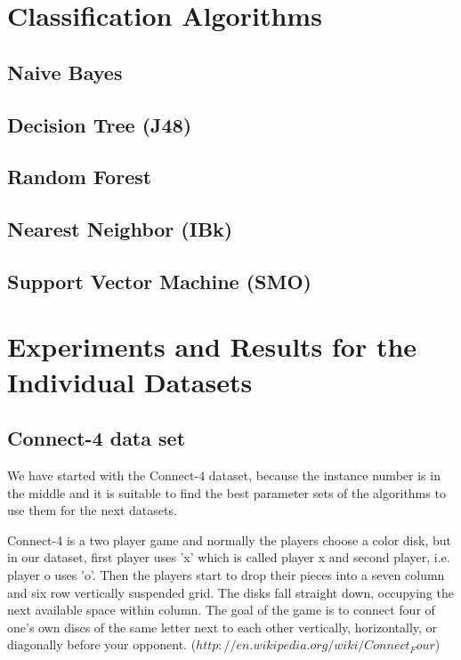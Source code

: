 \documentclass[a4paper]{article}
\begin{document}
\section{Classification Algorithms}

    \subsection{ Naive Bayes}
    \subsection{ Decision Tree (J48)}
    \subsection{ Random Forest}
    \subsection{ Nearest Neighbor (IBk)}
    \subsection{ Support Vector Machine (SMO)}

\section{Experiments and Results for the Individual Datasets}

\subsection{Connect-4 data set}

We have started with the Connect-4 dataset, because the instance number is in the middle and it is suitable to find the best parameter sets of the algorithms to use them for the next datasets.

Connect-4 is a two player game and normally the players choose a color disk, but in our dataset, first player uses 'x' which is called player x and second player, i.e. player o uses 'o'. Then the players start to drop their pieces into a seven column and six row vertically suspended grid. The disks fall straight down, occupying the next available space within column. The goal of the game is to connect four of one's own discs of the same letter next to each other vertically, horizontally, or diagonally before your opponent. ($http://en.wikipedia.org/wiki/Connect_Four$) 
\end{document}
